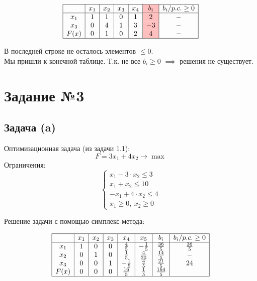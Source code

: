 \documentclass{article}
\begin{document}
\[
    \begin{array}{|c|c|c|c|c|>{\columncolor{pink}}c|c|}
        \hline
             & x_1 & x_2 & x_3 & x_4 & b_i & b_i/p.c. \geq 0 \\
        \hline
        x_1  & 1   & 1   & 0   & 1   & 2   & -               \\
        x_3  & 0   & 4   & 1   & 3   & -3  & -               \\
        F(x) & 0   & 1   & 0   & 2   & 4   & -               \\
        \hline
    \end{array}
\]

В последней строке не осталось элементов \(\leq 0\).\\
Мы пришли к конечной таблице. Т.к. не все \(b_i\geq 0\) \(\implies\) решения не существует.


\newpage

\section{Задание №3}
\subsection{Задача (a)}

Оптимизационная задача (из задачи 1.1):
\[
    F = 3x_1 + 4x_2 \to \max
\]
Ограничения:
\[
    \begin{cases}
        x_1 - 3 \cdot x_2 \leq 3  \\
        x_1 + x_2 \leq 10         \\
        -x_1 + 4 \cdot x_2 \leq 4 \\
        x_1 \geq 0, \ x_2 \geq 0
    \end{cases}
\]

Решение задачи с помощью симплекс-метода:

\[
    \begin{array}{|c|c|c|c|c|c|c|c|}
        \hline
             & x_1 & x_2 & x_3 & x_4          & x_5          & b_i           & b_i/p.c. \geq 0 \\
        \hline
        x_1  & 1   & 0   & 0   & \frac{4}{5}  & -\frac{1}{5} & \frac{36}{5}  & \frac{36}{5}    \\
        x_2  & 0   & 1   & 0   & \frac{1}{5}  & \frac{4}{20} & \frac{14}{5}  & -               \\
        x_3  & 0   & 0   & 1   & -\frac{1}{5} & \frac{4}{5}  & \frac{21}{5}  & 24              \\
        F(x) & 0   & 0   & 0   & \frac{16}{5} & \frac{1}{5}  & \frac{164}{5} &                 \\
        \hline
    \end{array}
\]
\end{document}
